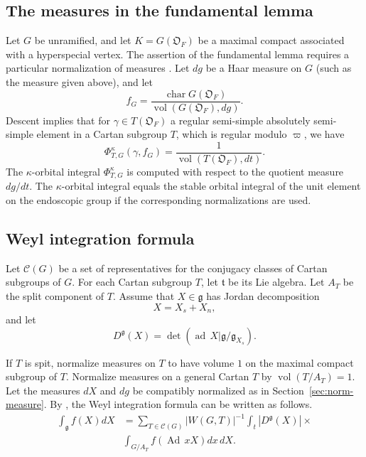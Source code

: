 \documentclass[11pt]{amsart}
\theoremstyle{definition}
\theoremstyle{remark}
\numberwithin{equation}{theorem}
\def\F{{F}}
\def\A{{\mathfrak{O}_\F}}
\def\gF{{\mathfrak{g}}}
\def\calC{{\mathcal{C}}}
\def\Ad{{\rm Ad}}
\def\vol{{\operatorname{vol}}}
\def\ad{{\rm ad}}
\def\op#1{\operatorname{#1}}
\def\lie#1{{\mathfrak{#1}}}
\def\vol{\operatorname{vol}}
\def\Ad{\operatorname{Ad}}
\def\ad{\operatorname{ad}}
\def\chr{\operatorname{char}}
\begin{document}
\subsection{The measures in the fundamental lemma}

Let $G$ be unramified, and let $K=G(\A)$ be a maximal compact
associated with a hyperspecial vertex.  The assertion of the
fundamental lemma requires a particular normalization of measures
\cite{HS}. Let $dg$ be a Haar measure on $G$ (such as the measure
given above), and let
    \begin{equation}f_{G} = {\frac{\chr
    G(\A)}{\vol(G(\A),dg)}}.
    \end{equation}
Descent implies that for $\gamma\in T(\A)$ a regular semi-simple
absolutely semi-simple element in a Cartan subgroup $T$, which is
regular modulo $\varpi$, we have \cite[Lemma 13.2]{HS}
    \begin{equation}\Phi^\kappa_{T,G}(\gamma,f_G) =
\frac{1}{\op{vol}(T(\A),dt)}.
    \end{equation}
The $\kappa$-orbital integral $\Phi^\kappa_{T,G}$ is computed with
respect to the quotient measure $dg/dt$. The $\kappa$-orbital
integral equals the stable orbital integral of the unit element on
the endoscopic group if the corresponding normalizations are used.

\subsection{Weyl integration formula}

Let $\calC(G)$ be a set of representatives for the conjugacy
classes of Cartan subgroups of $G$.  For each Cartan subgroup $T$,
let $\lie{t}$ be its Lie algebra.  Let $A_T$ be the split
component of $T$. Assume that $X\in\lie{g}$ has Jordan
decomposition
    \begin{equation}X = X_s + X_n,\end{equation} and let
    \begin{equation}D^{\gF}(X) = \det(\ad\,X |
\lie{g}/\lie{g}_{X_s}).\end{equation}

If $T$ is spit, normalize measures on $T$ to have volume $1$ on
the maximal compact subgroup of $T$.   Normalize measures on a
general Cartan $T$ by $\vol(T/A_T)=1$. Let the measures $dX$ and
$dg$ be compatibly normalized as in
Section~\ref{sec:norm-measure}. By \cite[page46]{WFT}, the Weyl
integration formula can be written as follows.
    \begin{equation}
    \begin{array}{lll}
    \int_\lie{g} f(X)dX &=
        \sum_{T\in\calC(G)}|W(G,T)|^{-1} \int_t
        |D^{\gF}(X)| \times\\
        &\int_{G/A_T} f(\Ad\,x X) dx\,dX.
    \end{array}
    \end{equation}
\end{document}
